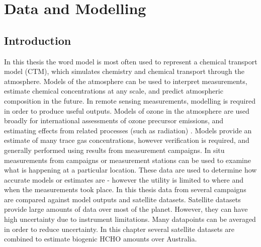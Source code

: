 
\chapter{Data and Modelling} %
\label{Model} %
  
\section{Introduction}
  
  In this thesis the word model is most often used to represent a chemical transport model (CTM), which simulates chemistry and chemical transport through the atmosphere.
  Models of the atmosphere can be used to interpret measurements, estimate chemical concentrations at any scale, and predict atmospheric composition in the future.
  In remote sensing measurements, modelling is required in order to produce useful outputs.
  Models of ozone in the atmosphere are used broadly for international assessments of ozone precursor emissions, and estimating effects from related processes (such as radiation) \parencite{Young2018}.
  Models provide an estimate of many trace gas concentrations, however verification is required, and generally performed using results from measurement campaigns.
  In situ measurements from campaigns or measurement stations can be used to examine what is happening at a particular location.
  These data are used to determine how accurate models or estimates are - however the utility is limited to where and when the measurements took place.
  In this thesis data from several campaigns are compared against model outputs and satellite datasets.
  Satellite datasets provide large amounts of data over most of the planet.
  However, they can have high uncertainty due to instrument limitations.
  Many datapoints can be averaged in order to reduce uncertainty.
  In this chapter several satellite datasets are combined to estimate biogenic HCHO amounts over Australia.
  
